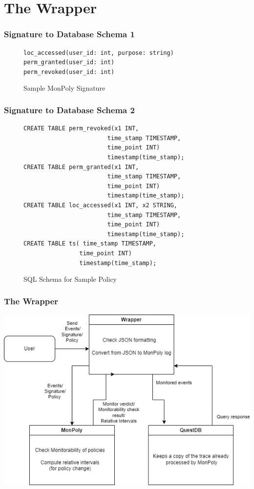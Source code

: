 \section{The Wrapper}


\begin{frame}[fragile]
    \frametitle{Signature to Database Schema 1}

\begin{figure}[H]
    \label{fig:example-signature}
\begin{verbatim}
loc_accessed(user_id: int, purpose: string)
perm_granted(user_id: int)
perm_revoked(user_id: int)
\end{verbatim}
    \caption{Sample MonPoly Signature}
\end{figure}
    
\end{frame}

\begin{frame}[fragile]
    \frametitle{Signature to Database Schema 2}
        \begin{figure}[H]
            \label{fig:example-policy-schema}
            \begin{verbatim}
CREATE TABLE perm_revoked(x1 INT,
                        time_stamp TIMESTAMP,
                        time_point INT) 
                        timestamp(time_stamp);
CREATE TABLE perm_granted(x1 INT,
                        time_stamp TIMESTAMP,
                        time_point INT) 
                        timestamp(time_stamp);
CREATE TABLE loc_accessed(x1 INT, x2 STRING,
                        time_stamp TIMESTAMP,
                        time_point INT) 
                        timestamp(time_stamp);
CREATE TABLE ts( time_stamp TIMESTAMP,
                time_point INT) 
                timestamp(time_stamp);
                \end{verbatim}
            \caption{SQL Schema for Sample Policy}
        \end{figure}
\end{frame}

\begin{frame}
    \frametitle{The Wrapper}
    \centering
    \includegraphics[width=0.9\linewidth]{diagrams/wrapper.png}
\end{frame}

